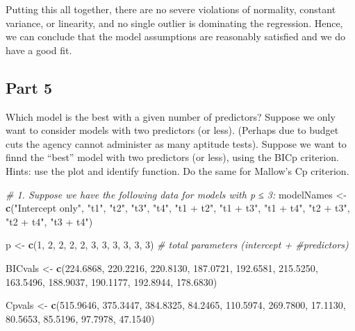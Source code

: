 \documentclass[
]{article}
\newenvironment{Shaded}{\begin{snugshade}}{\end{snugshade}}
\newcommand{\CommentTok}[1]{\textcolor[rgb]{0.56,0.35,0.01}{\textit{#1}}}
\newcommand{\DecValTok}[1]{\textcolor[rgb]{0.00,0.00,0.81}{#1}}
\newcommand{\FloatTok}[1]{\textcolor[rgb]{0.00,0.00,0.81}{#1}}
\newcommand{\FunctionTok}[1]{\textcolor[rgb]{0.13,0.29,0.53}{\textbf{#1}}}
\newcommand{\NormalTok}[1]{#1}
\newcommand{\OtherTok}[1]{\textcolor[rgb]{0.56,0.35,0.01}{#1}}
\newcommand{\StringTok}[1]{\textcolor[rgb]{0.31,0.60,0.02}{#1}}
\begin{document}
Putting this all together, there are no severe violations of normality,
constant variance, or linearity, and no single outlier is dominating the
regression. Hence, we can conclude that the model assumptions are
reasonably satisfied and we do have a good fit.

\subsection{Part 5}\label{part-5}

Which model is the best with a given number of predictors? Suppose we
only want to consider models with two predictors (or less). (Perhaps due
to budget cuts the agency cannot administer as many aptitude tests).
Suppose we want to finnd the ``best'' model with two predictors (or
less), using the BICp criterion. Hints: use the plot and identify
function. Do the same for Mallow's Cp criterion.

\begin{Shaded}
\begin{Highlighting}[]
\CommentTok{\# 1. Suppose we have the following data for models with p ≤ 3:}
\NormalTok{modelNames }\OtherTok{\textless{}{-}} \FunctionTok{c}\NormalTok{(}\StringTok{"Intercept only"}\NormalTok{, }
                \StringTok{"t1"}\NormalTok{, }\StringTok{"t2"}\NormalTok{, }\StringTok{"t3"}\NormalTok{, }\StringTok{"t4"}\NormalTok{,}
                \StringTok{"t1 + t2"}\NormalTok{, }\StringTok{"t1 + t3"}\NormalTok{, }\StringTok{"t1 + t4"}\NormalTok{,}
                \StringTok{"t2 + t3"}\NormalTok{, }\StringTok{"t2 + t4"}\NormalTok{, }\StringTok{"t3 + t4"}\NormalTok{)}

\NormalTok{p }\OtherTok{\textless{}{-}} \FunctionTok{c}\NormalTok{(}\DecValTok{1}\NormalTok{, }\DecValTok{2}\NormalTok{, }\DecValTok{2}\NormalTok{, }\DecValTok{2}\NormalTok{, }\DecValTok{2}\NormalTok{, }\DecValTok{3}\NormalTok{, }\DecValTok{3}\NormalTok{, }\DecValTok{3}\NormalTok{, }\DecValTok{3}\NormalTok{, }\DecValTok{3}\NormalTok{, }\DecValTok{3}\NormalTok{)  }\CommentTok{\# total parameters (intercept + \#predictors)}

\NormalTok{BICvals }\OtherTok{\textless{}{-}} \FunctionTok{c}\NormalTok{(}\FloatTok{224.6868}\NormalTok{, }\FloatTok{220.2216}\NormalTok{, }\FloatTok{220.8130}\NormalTok{, }\FloatTok{187.0721}\NormalTok{, }\FloatTok{192.6581}\NormalTok{,}
             \FloatTok{215.5250}\NormalTok{, }\FloatTok{163.5496}\NormalTok{, }\FloatTok{188.9037}\NormalTok{, }\FloatTok{190.1177}\NormalTok{, }\FloatTok{192.8944}\NormalTok{, }\FloatTok{178.6830}\NormalTok{)}

\NormalTok{Cpvals  }\OtherTok{\textless{}{-}} \FunctionTok{c}\NormalTok{(}\FloatTok{515.9646}\NormalTok{, }\FloatTok{375.3447}\NormalTok{, }\FloatTok{384.8325}\NormalTok{, }\FloatTok{84.2465}\NormalTok{, }\FloatTok{110.5974}\NormalTok{,}
             \FloatTok{269.7800}\NormalTok{, }\FloatTok{17.1130}\NormalTok{, }\FloatTok{80.5653}\NormalTok{, }\FloatTok{85.5196}\NormalTok{, }\FloatTok{97.7978}\NormalTok{, }\FloatTok{47.1540}\NormalTok{)}
\end{Highlighting}
\end{Shaded}
\end{document}
